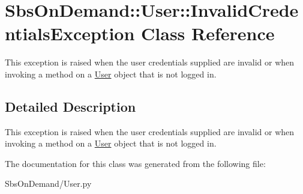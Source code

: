 \hypertarget{class_sbs_on_demand_1_1_user_1_1_invalid_credentials_exception}{
\section{\-Sbs\-On\-Demand\-:\-:\-User\-:\-:\-Invalid\-Credentials\-Exception \-Class \-Reference}
\label{class_sbs_on_demand_1_1_user_1_1_invalid_credentials_exception}
}


\-This exception is raised when the user credentials supplied are invalid or when invoking a method on a \hyperlink{class_sbs_on_demand_1_1_user_1_1_user}{\-User} object that is not logged in.  




\subsection{\-Detailed \-Description}
\-This exception is raised when the user credentials supplied are invalid or when invoking a method on a \hyperlink{class_sbs_on_demand_1_1_user_1_1_user}{\-User} object that is not logged in. 

\-The documentation for this class was generated from the following file\-:\begin{DoxyCompactItemize}
\item 
\-Sbs\-On\-Demand/\-User.\-py\end{DoxyCompactItemize}
